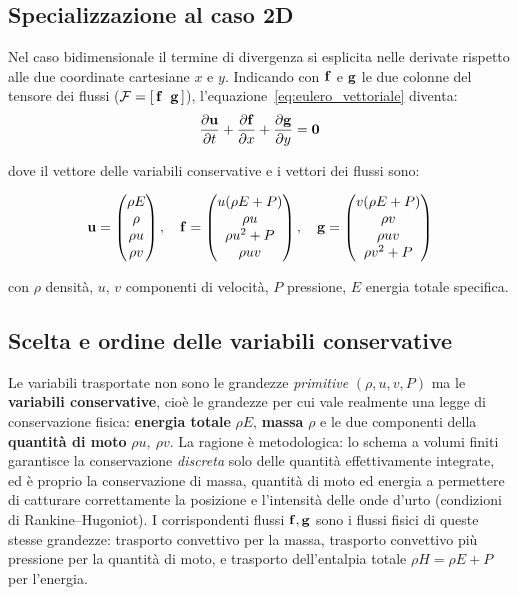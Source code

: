 \subsection{Specializzazione al caso 2D}

Nel caso bidimensionale il termine di divergenza si esplicita nelle derivate rispetto
alle due coordinate cartesiane $x$ e $y$.
Indicando con $\mathbf{f}$ e $\mathbf{g}$ le due colonne del tensore dei flussi
($\mathcal{F} = [\,\mathbf{f} \;\; \mathbf{g}\,]$), l'equazione~\eqref{eq:eulero_vettoriale}
diventa:
\begin{equation}
  \dfrac{\partial \mathbf{u}}{\partial t}
  + \dfrac{\partial \mathbf{f}}{\partial x}
  + \dfrac{\partial \mathbf{g}}{\partial y} = \bm{0}
  \label{eq:eulero_diff}
\end{equation}

dove il vettore delle variabili conservative e i vettori dei flussi sono:

\begin{equation}
  \mathbf{u} = \begin{pmatrix} \rho E \\ \rho \\ \rho u \\ \rho v \end{pmatrix}, \quad
  \mathbf{f} = \begin{pmatrix} u(\rho E + P) \\ \rho u \\ \rho u^2 + P \\ \rho u v \end{pmatrix}, \quad
  \mathbf{g} = \begin{pmatrix} v(\rho E + P) \\ \rho v \\ \rho u v \\ \rho v^2 + P \end{pmatrix}
\end{equation}

con $\rho$ densità, $u,\,v$ componenti di velocità, $P$ pressione, $E$ energia totale
specifica.

\subsection{Scelta e ordine delle variabili conservative}

Le variabili trasportate non sono le grandezze \emph{primitive} $(\rho, u, v, P)$ ma
le \textbf{variabili conservative}, cioè le grandezze per cui vale realmente una legge
di conservazione fisica: \textbf{energia totale} $\rho E$, \textbf{massa} $\rho$ e le
due componenti della \textbf{quantità di moto} $\rho u,\ \rho v$.
La ragione è metodologica: lo schema a volumi finiti garantisce la conservazione
\emph{discreta} solo delle quantità effettivamente integrate, ed è proprio la
conservazione di massa, quantità di moto ed energia a permettere di catturare
correttamente la posizione e l'intensità delle onde d'urto (condizioni di
Rankine--Hugoniot).
I corrispondenti flussi $\mathbf{f},\mathbf{g}$ sono i flussi fisici di queste stesse
grandezze: trasporto convettivo per la massa, trasporto convettivo più pressione per
la quantità di moto, e trasporto dell'entalpia totale $\rho H = \rho E + P$ per
l'energia.

